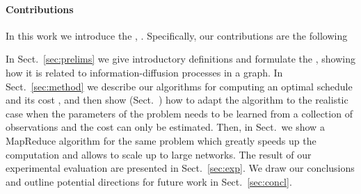 \paragraph*{Contributions}
In this work we introduce the \probname, .  Specifically, our
contributions are the following

\begin{itemize*}
	\item {}
\end{itemize*}

 In Sect.~\ref{sec:prelims} we give introductory
definitions and formulate the \probname, showing how it is related to
information-diffusion processes in a graph. In Sect.~\ref{sec:method} we
describe our algorithms for computing an optimal schedule and its cost
, and then show
(Sect.~) how to adapt the algorithm to the realistic case when the
parameters of the problem needs to be learned from a collection of observations
and the cost can only be estimated. Then, in Sect.~ we show a
MapReduce algorithm for the same problem which greatly speeds up the computation
and allows to scale up to large networks. The result of our experimental
evaluation are presented in Sect.~\ref{sec:exp}. We draw our conclusions and
outline potential directions for future work in Sect.~\ref{sec:concl}.
